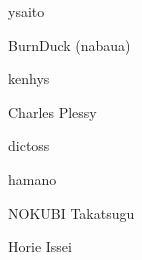 \begin{prework}{ ysaito }
\end{prework}

\begin{prework}{ BurnDuck (nabaua) }
\end{prework}

\begin{prework}{ kenhys }
\end{prework}

\begin{prework}{ Charles Plessy }
\end{prework}

\begin{prework}{ dictoss }
\end{prework}

\begin{prework}{ hamano }
\end{prework}

\begin{prework}{ NOKUBI Takatsugu }
\end{prework}

\begin{prework}{ Horie Issei }
\end{prework}

